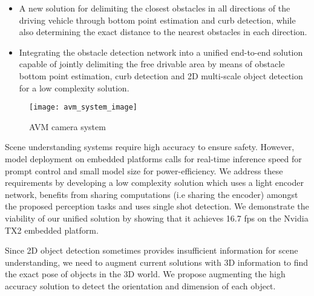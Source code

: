 \documentclass[10pt,twocolumn,letterpaper]{article}
\begin{document}
\begin{itemize}
\item A new solution for delimiting the closest obstacles in all directions of the driving vehicle through bottom point estimation and curb detection, while also determining the exact distance to the nearest obstacles in each direction.
\item Integrating the obstacle detection network into a unified end-to-end solution capable of jointly delimiting the free drivable area by means of obstacle bottom point estimation, curb detection  and 2D multi-scale object detection for a low complexity solution.
\end{itemize}


\begin{figure}[t]
\begin{center}
\texttt{[image: avm\_system\_image]}
\end{center}
   \caption{AVM camera system}
\label{fig:deepthinq}
\end{figure}

Scene understanding systems require high accuracy to ensure safety. However, model deployment on embedded platforms calls for real-time inference speed for prompt control and small model size for power-efficiency. We address these requirements by developing a low complexity solution which uses a light encoder network, benefits from sharing computations (i.e sharing the encoder) amongst the proposed perception tasks and uses single shot detection. We demonstrate the viability of our unified solution by showing that it achieves 16.7 fps on the Nvidia TX2 embedded platform.

Since 2D object detection sometimes provides insufficient information for scene understanding, we need to augment current solutions with 3D information to find the exact pose of objects in the 3D world. We propose augmenting the high accuracy solution to detect the orientation and dimension of each object.
\end{document}
